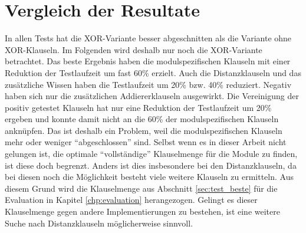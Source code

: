 \section{Vergleich der Resultate}

In allen Tests hat die XOR-Variante besser abgeschnitten als die Variante ohne XOR-Klauseln. Im Folgenden wird deshalb nur noch die XOR-Variante betrachtet.
Das beste Ergebnis haben die modulspezifischen Klauseln mit einer Reduktion der Testlaufzeit um fast 60\% erzielt. Auch die Distanzklauseln und das zusätzliche
Wissen haben die Testlaufzeit um 20\% bzw. 40\% reduziert. Negativ haben sich nur die zusätzlichen Addiererklauseln ausgewirkt. Die Vereinigung der positiv
getestet Klauseln hat nur eine Reduktion der Testlaufzeit um 20\% ergeben und konnte damit nicht an die 60\% der modulspezifischen Klauseln anknüpfen. Das ist
deshalb ein Problem, weil die modulspezifischen Klauseln mehr oder weniger "`abgeschlossen"' sind. Selbst wenn es in dieser Arbeit nicht gelungen ist, die
optimale "`vollständige"' Klauselmenge für die Module zu finden, ist diese doch begrenzt. Anders ist dies insbesondere bei den Distanzklauseln, da bei diesen
noch die Möglichkeit besteht viele weitere Klauseln zu ermitteln. Aus diesem Grund wird die Klauselmenge aus Abschnitt \ref{sec:test_beste} für die Evaluation
in Kapitel \ref{chp:evaluation} herangezogen. Gelingt es dieser Klauselmenge gegen andere Implementierungen zu bestehen, ist eine weitere Suche nach
Distanzklauseln möglicherweise sinnvoll.
